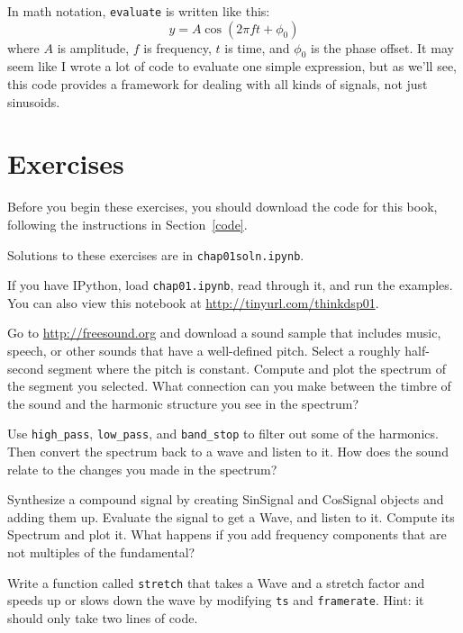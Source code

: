 \documentclass[12pt]{book}
\begin{document}
In math notation, {\tt evaluate} is written like this:
%
\[ y = A \cos (2 \pi f t + \phi_0) \]
%
where $A$ is amplitude, $f$ is frequency, $t$ is time, and $\phi_0$
is the phase offset.  It may seem like I wrote a lot of code
to evaluate one simple expression, but as we'll see, this code
provides a framework for dealing with all kinds of signals, not
just sinusoids.


\section{Exercises}

Before you begin these exercises, you should download the code
for this book, following the instructions in Section~\ref{code}.

Solutions to these exercises are in {\tt chap01soln.ipynb}.

\begin{exercise}
If you have IPython, load {\tt chap01.ipynb}, read through it, and run
the examples.  You can also view this notebook at
\url{http://tinyurl.com/thinkdsp01}.
\end{exercise}


\begin{exercise}
Go to \url{http://freesound.org} and download a sound sample that
includes music, speech, or other sounds that have a well-defined pitch.
Select a roughly half-second segment where the pitch is
constant.  Compute and plot the spectrum of the segment you selected.
What connection can you make between the timbre of the sound and the
harmonic structure you see in the spectrum?

Use \verb"high_pass", \verb"low_pass", and \verb"band_stop" to
filter out some of the harmonics.  Then convert the spectrum back
to a wave and listen to it.  How does the sound relate to the
changes you made in the spectrum?
\end{exercise}


\begin{exercise}
Synthesize a compound signal by creating SinSignal and CosSignal
objects and adding them up.  Evaluate the signal to get a Wave,
and listen to it.  Compute its Spectrum and plot it.
What happens if you add frequency
components that are not multiples of the fundamental?
\end{exercise}


\begin{exercise}
Write a function called {\tt stretch} that takes a Wave and a stretch
factor and speeds up or slows down the wave by modifying {\tt ts} and
{\tt framerate}.  Hint: it should only take two lines of code.
\end{exercise}
\end{document}
